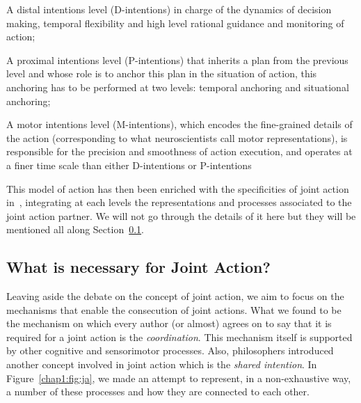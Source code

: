 \documentclass[a4paper,11pt,twoside]{StyleThese}
\begin{document}
\begin{bulletList}
	\item A distal intentions level (D-intentions) in charge of the dynamics of decision making, temporal flexibility and high level rational guidance and monitoring of action;
	\item A proximal intentions level (P-intentions) that inherits a plan from the previous level and whose role is to anchor this plan in the situation of action, this anchoring has to be performed at two levels: temporal anchoring and situational anchoring;
	\item A motor intentions level (M-intentions), which encodes the fine-grained details of the action (corresponding to what neuroscientists call motor representations), is responsible for the precision and smoothness of action execution, and operates at a finer time scale than either D-intentions or P-intentions
\end{bulletList}

This model of action has then been enriched with the specificities of joint action in~\cite{pacherie_2012_agency}, integrating at each levels the representations and processes associated to the joint action partner. We will not go through the details of it here but they will be mentioned all along Section~\ref{chap1:subsec:necess_ja}.

\subsection{What is necessary for Joint Action?}\label{chap1:subsec:necess_ja}

Leaving aside the debate on the concept of joint action, we aim to focus on the mechanisms that enable the consecution of joint actions. What we found to be the mechanism on which every author (or almost) agrees on to say that it is required for a joint action is the \emph{coordination}. This mechanism itself is supported by other cognitive and sensorimotor processes. Also, philosophers introduced another concept involved in joint action which is the \emph{shared intention}. In Figure~\ref{chap1:fig:ja}, we made an attempt to represent, in a non-exhaustive way, a number of these processes and how they are connected to each other.
\end{document}
